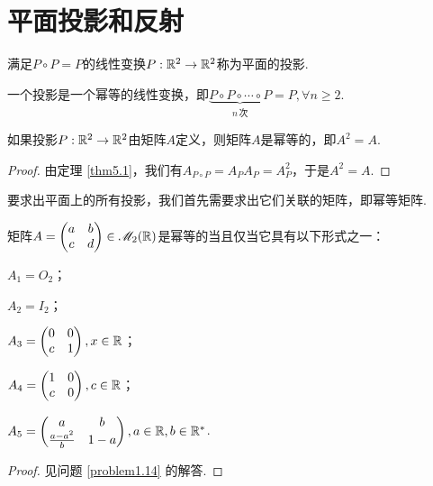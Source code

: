 \section{平面投影和反射}
\begin{definition}
  满足$P\circ P=P$的线性变换$P:\mathbb R^2\to\mathbb R^2$称为平面的{\kaishu 投影}.
\end{definition}

\begin{remark}
  一个投影是一个幂等的线性变换，即$\underbrace{P\circ P\circ\cdots\circ P}_{n\,\text{次}}=P,\forall n\ge2$.
\end{remark}

\begin{theorem}
  如果投影$P:\mathbb R^2\to\mathbb R^2$由矩阵$A$定义，则矩阵$A$是幂等的，即$A^2=A$.
\end{theorem}
\begin{proof}
  由定理 \ref{thm5.1}，我们有$A_{P\circ P}=A_PA_P=A_P^2$，于是$A^2=A$.
\end{proof}

要求出平面上的所有投影，我们首先需要求出它们关联的矩阵，即幂等矩阵.
\begin{mybox}
  \begin{theorem}[实幂等矩阵.]

    矩阵$A=\begin{pmatrix}
      a & b \\
      c & d
    \end{pmatrix}\in\mathscr M_2(\mathbb R)$是幂等的当且仅当它具有以下形式之一：
    \begin{enum}
      \item $A_1=O_2$；
      \item $A_2=I_2$；
      \item $A_3=\begin{pmatrix}
        0 & 0 \\
        c & 1
      \end{pmatrix},x\in\mathbb R$；
      \item $A_4=\begin{pmatrix}
        1 & 0 \\
        c & 0
      \end{pmatrix},c\in\mathbb R$；
      \item $A_5=\begin{pmatrix}
        a & b \\
        \frac{a-a^2}b & 1 - a
      \end{pmatrix},a\in\mathbb R,b\in\mathbb R^\ast$.
    \end{enum}
  \end{theorem}
\end{mybox}
\begin{proof}
  见问题 \ref{problem1.14} 的解答.
\end{proof}

